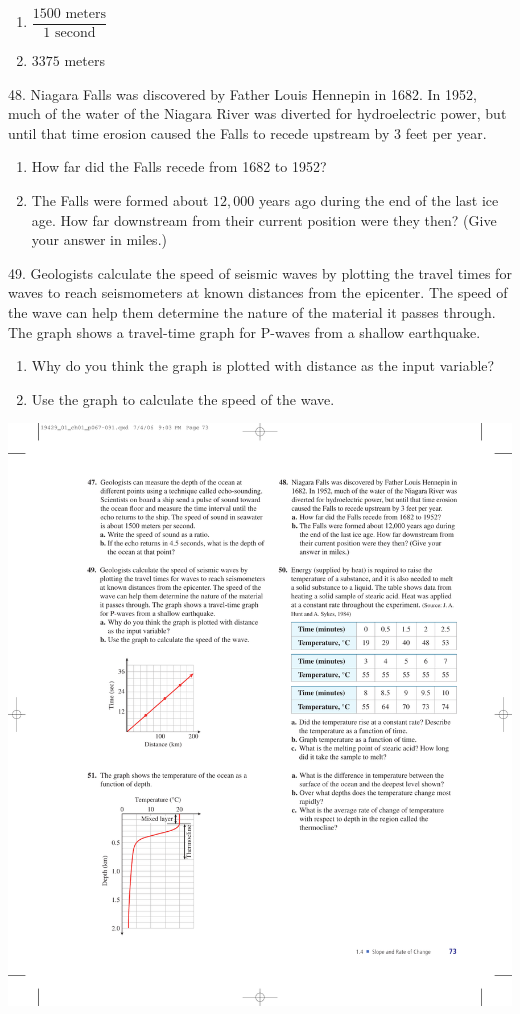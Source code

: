 \documentclass[10pt,]{book}
\theoremstyle{plain}
\theoremstyle{definition}
\theoremstyle{definition}
\theoremstyle{definition}
\theoremstyle{definition}
\numberwithin{equation}{part}
\begin{document}
\begin{exerciselist}
\begin{multicols}{2}
\begin{enumerate}[label=*\alph**]
\item\hypertarget{li-1038}{}\(\dfrac{1500\text{ meters}}{1 \text{ second}} \)%
\item\hypertarget{li-1039}{}\(3375\)  meters%
\end{enumerate}
\end{multicols}
%
\item[48.]\hypertarget{exercise-263}{}Niagara Falls was discovered by Father Louis Hennepin in 1682. In 1952, much of the water of the Niagara River was diverted for hydroelectric power, but until that time erosion caused the Falls to recede upstream by \(3\) feet per year. \leavevmode%
\begin{enumerate}[label=*\alph**]
\item\hypertarget{li-1040}{}How far did the Falls recede from 1682 to 1952?%
\item\hypertarget{li-1041}{}The Falls were formed about \(12,000\) years ago during the end of the last ice age. How far downstream from their current position were they then? (Give your answer in miles.)%
\end{enumerate}
%
\par\smallskip
\item[49.]\hypertarget{exercise-264}{}Geologists calculate the speed of seismic waves by plotting the travel times for waves to reach seismometers at known distances from the epicenter. The speed of the wave can help them determine the nature of the material it passes through. The graph shows a  travel-time graph for P-waves from a shallow earthquake. \leavevmode%
\begin{enumerate}[label=*\alph**]
\item\hypertarget{li-1042}{}Why do you think the graph is plotted with distance as the input variable?%
\item\hypertarget{li-1043}{}Use the graph to calculate the speed of the wave.%
\end{enumerate}
 \includegraphics[width=0.4\linewidth]{images/fig-ex-1-4-49}

\end{exerciselist}
\end{document}
